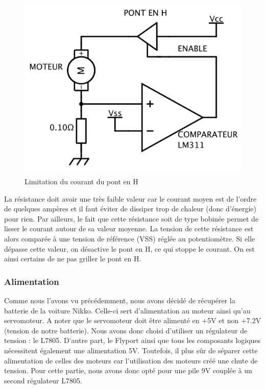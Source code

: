 \documentclass[a4paper,12pt]{report}
\begin{document}
\begin{figure}[!h]
	\begin{center}
		\includegraphics[scale=1]{images/limitationcourant.png}
	\end{center}
	\caption{Limitation du courant du pont en H} 
	\label{limitationcourant}
\end{figure}

La résistance doit avoir une très faible valeur car le courant moyen est de l’ordre de quelques ampères et il faut éviter de dissiper trop de chaleur (donc d’énergie) pour rien. Par ailleurs, le fait que cette résistance soit de type bobinée permet de lisser le courant autour de sa valeur moyenne.
La tension de cette résistance est alors comparée à une tension de référence (VSS) réglée au potentiomètre. Si elle dépasse cette valeur, on désactive le pont en H, ce qui stoppe le courant. On est ainsi certains de ne pas griller le pont en H.
			
			\subsubsection{Alimentation}
			Comme nous l’avons vu précédemment, nous avons décidé de récupérer la batterie de la voiture Nikko. Celle-ci sert d’alimentation au moteur ainsi qu’au servomoteur. A noter que le servomoteur doit être alimenté en +5V et non +7.2V (tension de notre batterie). Nous avons donc choisi d’utiliser un régulateur de tension : le L7805.
D’autre part, le Flyport ainsi que tous les composants logiques nécessitent également une alimentation 5V. Toutefois, il plus sûr de séparer cette alimentation de celles des moteurs car l’utilisation des moteurs créé une chute de tension. Pour cette partie, nous avons donc opté pour une pile 9V couplée à un second régulateur L7805.
			
\end{document}
